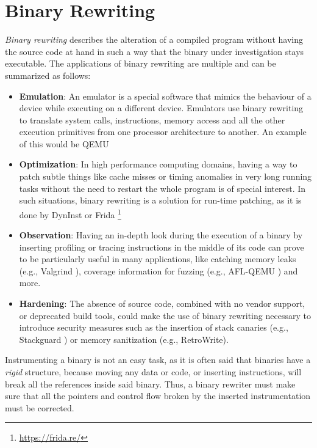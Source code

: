 \documentclass[a4paper,11pt,oneside]{report}
\newcommand{\sysname}{RetroWrite\xspace}
\begin{document}
\section{Binary Rewriting}
\emph{Binary rewriting} describes the alteration of a compiled program without 
having the source code at hand in such a way that the binary under 
investigation stays executable. The applications of binary rewriting are 
multiple and can be summarized as follows:
\begin{itemize}
	\item \textbf{Emulation}: An emulator is a special software that mimics the 
		behaviour of a device while executing on a different device. Emulators 
		use binary rewriting to translate system calls, instructions, memory 
		access and all the other execution primitives from one processor 
		architecture to another.  An example of this would be QEMU \cite{qemu}

	\item \textbf{Optimization}: In high performance computing domains, having 
		a way to patch subtle things like cache misses or timing anomalies in 
		very long running tasks without the need to restart the whole program 
		is of special interest. In such situations, binary rewriting is a 
		solution for run-time patching, as it is done by DynInst \cite{dyninst} 
		or Frida \footnote{\url{https://frida.re/}}

	\item \textbf{Observation}: Having an in-depth look during the execution of 
		a binary by inserting profiling or tracing instructions in the middle 
		of its code can prove to be particularly useful in many applications, 
		like catching memory leaks (e.g., Valgrind \cite{valgrind}), coverage 
		information for fuzzing (e.g., AFL-QEMU \cite{afl}) and more.

	\item \textbf{Hardening}: The absence of source code, combined with no 
		vendor support, or deprecated build tools, could make the use of binary 
		rewriting necessary to introduce security measures such as the 
		insertion of stack canaries (e.g., Stackguard \cite{stackguard}) or 
		memory sanitization (e.g., \sysname \cite{dinesh20oakland}).
	
\end{itemize}

Instrumenting a binary is not an easy task, as it is often said that binaries 
have a \emph{rigid} structure, because moving any data or code, or inserting 
instructions, will break all the references inside said binary. Thus, a binary 
rewriter must make sure that all the pointers and control flow broken by the 
inserted instrumentation must be corrected.
\end{document}
